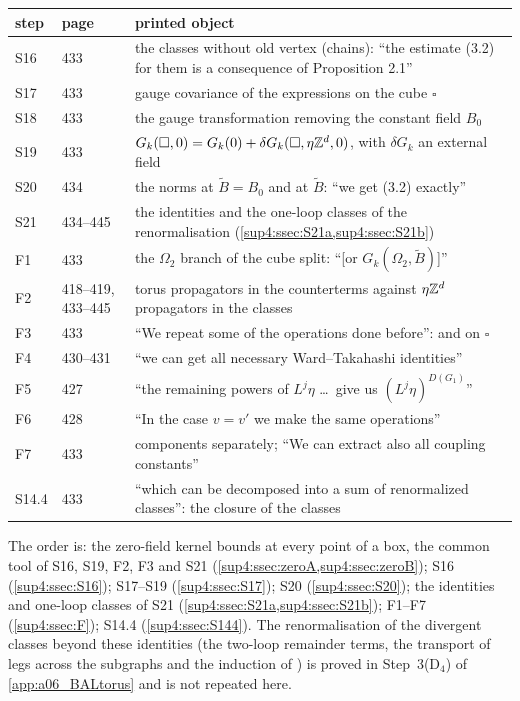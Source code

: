 \begin{center}
\begin{tabular}{lll}
step & \cite{Ba3} page & printed object\\\hline
S16 & 433 & the classes without old vertex (chains): ``the estimate (3.2) for them is a consequence of Proposition 2.1''\\
S17 & 433 & gauge covariance of the expressions on the cube $\square$\\
S18 & 433 & the gauge transformation removing the constant field $B_0$\\
S19 & 433 & $G_k(\square,0)=G_k(0)+\delta G_k(\square,\eta\mathbb Z^d,0)$, with $\delta G_k$ an external field\\
S20 & 434 & the norms \cite[(1.32)]{Ba3} at $\tilde B=B_0$ and at $\tilde B$: ``we get (3.2) exactly''\\
S21 & 434--445 & the identities and the one-loop classes of the renormalisation (\cref{sup4:ssec:S21a,sup4:ssec:S21b})\\
F1 & 433 & the $\Omega_2$ branch of the cube split: ``[or $G_k(\Omega_2,\tilde B)$]''\\
F2 & 418--419, 433--445 & torus propagators in the counterterms against $\eta\mathbb Z^d$ propagators in the classes\\
F3 & 433 & ``We repeat some of the operations done before'': \cite[(1.16)]{Ba3} and \cite[(3.1)]{Ba3} on $\square$\\
F4 & 430--431 & ``we can get all necessary Ward--Takahashi identities''\\
F5 & 427 & ``the remaining powers of $L^j\eta$ \dots\ give us $(L^j\eta)^{D(G_1)}$''\\
F6 & 428 & ``In the case $v=v'$ we make the same operations''\\
F7 & 433 & components separately; ``We can extract also all coupling constants''\\
S14.4 & 433 & ``which can be decomposed into a sum of renormalized classes'': the closure of the classes
\end{tabular}
\end{center}

The order is: the zero-field kernel bounds at every point of a box, the common tool of S16, S19, F2, F3 and S21 (\cref{sup4:ssec:zeroA,sup4:ssec:zeroB}); S16 (\cref{sup4:ssec:S16}); S17--S19 (\cref{sup4:ssec:S17}); S20 (\cref{sup4:ssec:S20}); the identities and one-loop classes of S21 (\cref{sup4:ssec:S21a,sup4:ssec:S21b}); F1--F7 (\cref{sup4:ssec:F}); S14.4 (\cref{sup4:ssec:S144}). The renormalisation of the divergent classes beyond these identities (the two-loop remainder terms, the transport of legs across the subgraphs \cite[(2.4)]{Ba3} and the induction of \cite[pp.~444--445]{Ba3}) is proved in Step~3(D$_4$) of \cref{app:a06_BALtorus} and is not repeated here.

